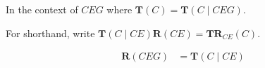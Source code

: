 \documentclass[12pt]{homework}
\theoremstyle{definition}
\theoremstyle{plain}
\begin{document}
\maketitle

\setcounter{questionCounter}{0}
\setcounter{section}{1}

\def\T{\mathbf{T}}
\def\R{\mathbf{R}}
\def\TR{\mathbf{TR}}

In the context of \(CEG\) where \(\T(C) = \T(C \mid CEG)\).

For shorthand, write \(\T(C \mid CE) \R(CE) = \TR_{CE}(C)\).

\begin{align*}
    \R(CEG) &= \T(C \mid CE)
\end{align*}
\end{document}
